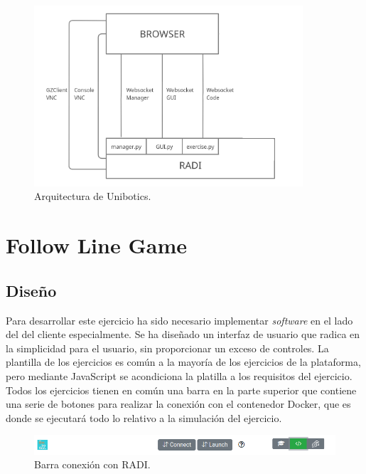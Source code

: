 \documentclass[a4paper, 12pt]{book}
\begin{document}
\begin{figure}[H]
	\centering
    \includegraphics[width=10cm]{img/robotics_academy_architecture.png}
    \caption{Arquitectura de Unibotics.}
    \label{figura:unibotics_architecture}
\end{figure}

\section{Follow Line Game} 
\label{sec:follow_line_game}

\subsection{Diseño}
\label{subsec:follow_line_game_diseño}

Para desarrollar este ejercicio ha sido necesario implementar \emph{software}  en el lado del del cliente especialmente. Se ha diseñado un interfaz de usuario que radica en la simplicidad para el usuario, sin proporcionar un exceso de controles. La plantilla de los ejercicios es común a la mayoría de los ejercicios de la plataforma, pero mediante JavaScript se acondiciona la platilla a los requisitos del ejercicio. Todos los ejercicios tienen en común una barra en la parte superior que contiene una serie de botones para realizar la conexión con el contenedor Docker, que es donde se ejecutará todo lo relativo a la simulación del ejercicio.

\begin{figure}[H]
	\centering
    \includegraphics[width=15cm]{img/barra_radi.png}
    \caption{Barra conexión con RADI.}
    \label{figura:conexion_radi}
\end{figure}
\end{document}
